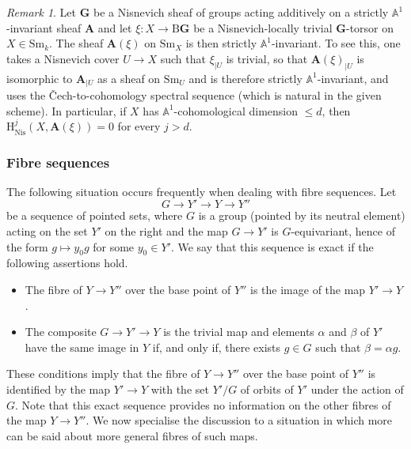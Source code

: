 \documentclass[11pt,leqno]{amsart}
\renewcommand{\1}{{\rm 1\hspace*{-0.4ex}%
\rule{0.1ex}{1.52ex}\hspace*{0.2ex}}}
\newcommand{\Nis}{{\operatorname{Nis}}}
\newcommand{\Sm}{\mathrm{Sm}}
\newcommand{\Hr}{{\mathrm {H}}}
\newcommand{\<}[1]{{\langle}#1 {\rangle}}
\newcommand{\Abf}{\mathbf{A}}
\newcommand{\Abb}{\mathbb{A}}
\newcommand{\Gbf}{\mathbf{G}}
\newcommand{\Br}{\mathrm{B}}
\theoremstyle{plain}
\theoremstyle{definition}
\theoremstyle{remark}
\newtheorem{rem}[thm]{Remark}
\numberwithin{equation}{section}
\begin{document}
\begin{rem}
Let $\Gbf$ be a Nisnevich sheaf of groups acting additively on a strictly $\Abb^1$-invariant sheaf $\Abf$ and let $\xi:X\to\Br\Gbf$ be a Nisnevich-locally trivial $\Gbf$-torsor on $X\in\Sm_k$. The sheaf $\Abf(\xi)$ on $\Sm_X$ is then strictly $\Abb^1$-invariant. To see this, one takes a Nisnevich cover $U\to X$ such that $\xi_{|U}$ is trivial, so that $\Abf(\xi)_{|U}$ is isomorphic to $\Abf_{|U}$ as a sheaf on $\Sm_U$ and is therefore strictly $\Abb^1$-invariant, and uses the Čech-to-cohomology spectral sequence (which is natural in the given scheme). In particular, if $X$ has $\Abb^1$-cohomological dimension $\leq d$, then $\Hr_\Nis^j(X,\Abf(\xi))=0$ for every $j>d$.
\end{rem}


\subsubsection*{Fibre sequences}

The following situation occurs frequently when dealing with fibre sequences. Let \[G\to Y'\to Y\to Y''\] be a sequence of pointed sets, where $G$ is a group (pointed by its neutral element) acting on the set $Y'$ on the right and the map $G\to Y'$ is $G$-equivariant, hence of the form $g\mapsto y_0g$ for some $y_0\in Y'$. We say that this sequence is exact if the following assertions hold.
\begin{itemize}
    \item The fibre of $Y\to Y''$ over the base point of $Y''$ is the image of the map $Y'\to Y$.
    \item The composite $G\to Y'\to Y$ is the trivial map and elements $\alpha$ and $\beta$ of $Y'$ have the same image in $Y$ if, and only if, there exists $g\in G$ such that $\beta=\alpha g$.
\end{itemize}
These conditions imply that the fibre of $Y\to Y''$ over the base point of $Y''$ is identified by the map $Y'\to Y$ with the set $Y'/G$ of orbits of $Y'$ under the action of $G$. Note that this exact sequence provides no information on the other fibres of the map $Y\to Y''$. We now specialise the discussion to a situation in which more can be said about more general fibres of such maps.
\end{document}

